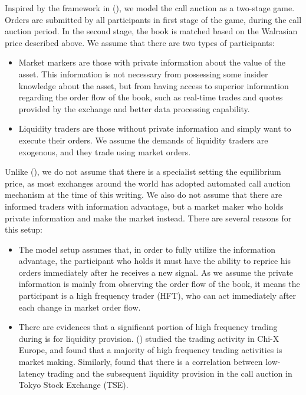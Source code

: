 \documentclass{article}
\begin{document}
Inspired by the framework in (\cite{Madhavan2015}), we model the call auction as a two-stage game. Orders are submitted by all participants in first stage of the game, during the call auction period. In the second stage, the book is matched based on the Walrasian price described above. We assume that there are two types of participants:

\begin{itemize}
  \item Market markers are those with private information about the value of the asset. This information is not necessary from possessing some insider knowledge about the asset, but from having access to superior information regarding the order flow of the book, such as real-time trades and quotes provided by the exchange and better data processing capability.
  \item Liquidity traders are those without private information and simply want to execute their orders. We assume the demands of liquidity traders are exogenous, and they trade using market orders.
\end{itemize}

Unlike (\cite{Madhavan2015}), we do not assume that there is a specialist setting the equilibrium price, as most exchanges around the world has adopted automated call auction mechanism at the time of this writing. We also do not assume that there are informed traders with information advantage, but a market maker who holds private information and make the market instead. There are several reasons for this setup:
\begin{itemize}
  \item The model setup assumes that, in order to fully utilize the information advantage, the participant who holds it must have the ability to reprice his orders immediately after he receives a new signal. As we assume the private information is mainly from observing the order flow of the book, it means the participant is a high frequency trader (HFT), who can act immediately after each change in market order flow.
  \item There are evidences that a significant portion of high frequency trading during is for liquidity provision. (\cite{Menkveld2013}) studied the trading activity in Chi-X Europe, and found that a majority of high frequency trading activities is market making. Similarly, \cite{Bellia2017} found that there is a correlation between low-latency trading and the subsequent liquidity provision in the call auction in Tokyo Stock Exchange (TSE).
\end{itemize}
\end{document}
